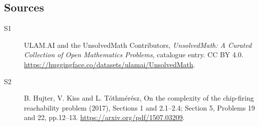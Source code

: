 \documentclass[11pt]{article}
\begin{document}
\subsection{Sources}
\begin{description}
\item[\hypertarget{source:statement:1}{S1}] ULAM.AI and the UnsolvedMath Contributors, \emph{UnsolvedMath: A Curated Collection of Open Mathematics Problems}, catalogue entry. CC BY 4.0. \url{https://huggingface.co/datasets/ulamai/UnsolvedMath}.
\item[\hypertarget{source:statement:2}{S2}] B. Hujter, V. Kiss and L. Tóthmérész, On the complexity of the chip-firing reachability problem (2017), Sections 1 and 2.1--2.4; Section 5, Problems 19 and 22, pp.12--13. \url{https://arxiv.org/pdf/1507.03209}.
\end{description}
\label{end:statement}
\end{document}
